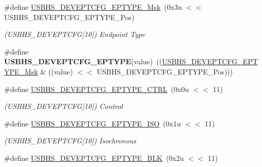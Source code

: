 \begin{DoxyCompactItemize}
\#define \mbox{\hyperlink{group__SAME70__USBHS_ga1d958ff9ac36dece0834fdbc705fe4dc}{U\+S\+B\+H\+S\+\_\+\+D\+E\+V\+E\+P\+T\+C\+F\+G\+\_\+\+E\+P\+T\+Y\+P\+E\+\_\+\+Msk}}~(0x3u $<$$<$ U\+S\+B\+H\+S\+\_\+\+D\+E\+V\+E\+P\+T\+C\+F\+G\+\_\+\+E\+P\+T\+Y\+P\+E\+\_\+\+Pos)
\begin{DoxyCompactList}\small\item\em (U\+S\+B\+H\+S\+\_\+\+D\+E\+V\+E\+P\+T\+C\+FG\mbox{[}10\mbox{]}) Endpoint Type \end{DoxyCompactList}\item 
\mbox{\label{group__SAME70__USBHS_gad59c403a7daeaa04dbaf5d2b56b5bf5b}} 
\#define {\bfseries U\+S\+B\+H\+S\+\_\+\+D\+E\+V\+E\+P\+T\+C\+F\+G\+\_\+\+E\+P\+T\+Y\+PE}(value)~((\mbox{\hyperlink{group__SAMV71__USBHS_ga1d958ff9ac36dece0834fdbc705fe4dc}{U\+S\+B\+H\+S\+\_\+\+D\+E\+V\+E\+P\+T\+C\+F\+G\+\_\+\+E\+P\+T\+Y\+P\+E\+\_\+\+Msk}} \& ((value) $<$$<$ U\+S\+B\+H\+S\+\_\+\+D\+E\+V\+E\+P\+T\+C\+F\+G\+\_\+\+E\+P\+T\+Y\+P\+E\+\_\+\+Pos)))
\item 
\mbox{\label{group__SAME70__USBHS_gaad3788fed33d8c54c856093e2f45258f}} 
\#define \mbox{\hyperlink{group__SAME70__USBHS_gaad3788fed33d8c54c856093e2f45258f}{U\+S\+B\+H\+S\+\_\+\+D\+E\+V\+E\+P\+T\+C\+F\+G\+\_\+\+E\+P\+T\+Y\+P\+E\+\_\+\+C\+T\+RL}}~(0x0u $<$$<$ 11)
\begin{DoxyCompactList}\small\item\em (U\+S\+B\+H\+S\+\_\+\+D\+E\+V\+E\+P\+T\+C\+FG\mbox{[}10\mbox{]}) Control \end{DoxyCompactList}\item 
\mbox{\label{group__SAME70__USBHS_ga87d13f79eb203b988827d920c0fb3fb5}} 
\#define \mbox{\hyperlink{group__SAME70__USBHS_ga87d13f79eb203b988827d920c0fb3fb5}{U\+S\+B\+H\+S\+\_\+\+D\+E\+V\+E\+P\+T\+C\+F\+G\+\_\+\+E\+P\+T\+Y\+P\+E\+\_\+\+I\+SO}}~(0x1u $<$$<$ 11)
\begin{DoxyCompactList}\small\item\em (U\+S\+B\+H\+S\+\_\+\+D\+E\+V\+E\+P\+T\+C\+FG\mbox{[}10\mbox{]}) Isochronous \end{DoxyCompactList}\item 
\mbox{\label{group__SAME70__USBHS_ga0e7b543add6ac23998dae0d7eb75a5d5}} 
\#define \mbox{\hyperlink{group__SAME70__USBHS_ga0e7b543add6ac23998dae0d7eb75a5d5}{U\+S\+B\+H\+S\+\_\+\+D\+E\+V\+E\+P\+T\+C\+F\+G\+\_\+\+E\+P\+T\+Y\+P\+E\+\_\+\+B\+LK}}~(0x2u $<$$<$ 11)
$$
\end{DoxyCompactItemize}
